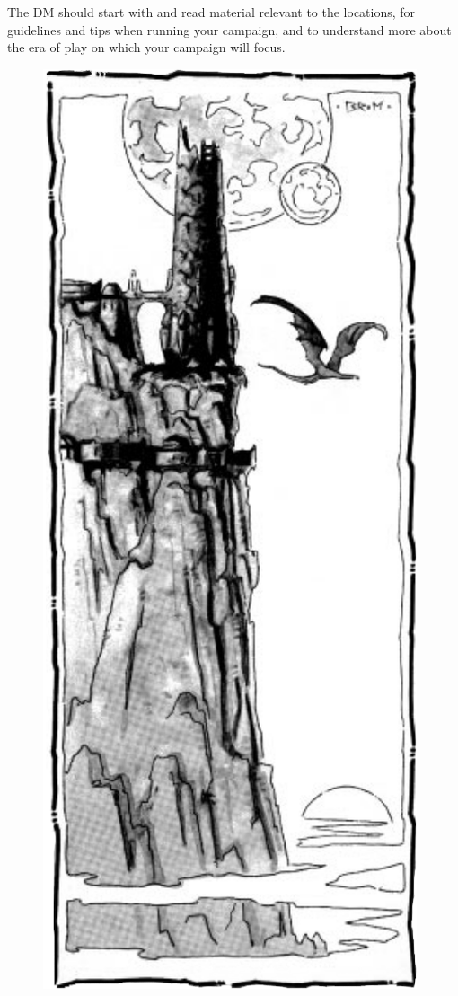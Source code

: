 The DM should start with  and read material relevant to the locations,  for guidelines and tips when running your campaign, and  to understand more about the era of play on which your campaign will focus.

\begin{figure}[t!]
\centering
\includegraphics[width=\columnwidth-8mm]{images/tower-1.png}
\WOTC
\end{figure}


